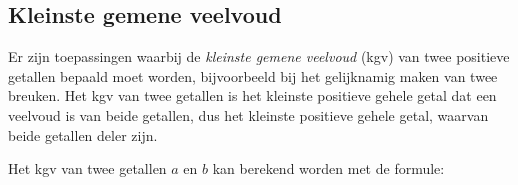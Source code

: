 \documentclass[a4paper,10pt,fleqn,twoside]{article}
\DeclareMathOperator{\ggd}{ggd}
\begin{document}

\subsection{Kleinste gemene veelvoud}
Er zijn toepassingen waarbij de \textsl{kleinste gemene veelvoud} (kgv) van twee positieve getallen bepaald moet worden, bijvoorbeeld bij het gelijknamig maken van twee breuken. Het kgv van twee getallen is het kleinste positieve gehele getal dat een veelvoud is van beide getallen, dus het kleinste positieve gehele getal, waarvan beide getallen deler zijn.

Het kgv van twee getallen $a$ en $b$ kan berekend worden met de formule:
\end{document}
